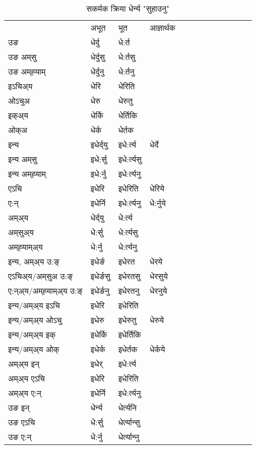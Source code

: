 \begin{table}[H]
\centering
\caption{\label{ert.vt} सकर्मक क्रिया  धेर्न्य  "सुहाउनु"  }
\begin{tabular}{l|l|l|l|l|l|l|l|l|l|l|l|l}  \toprule
&अभूत & भूत & आज्ञार्थक \\ 
उङ &धेर्दु &धे:र्त \\ 
उङ अम्‌सु&धेर्दुसु &धे:र्तसु \\ 
उङ अम्‌ह्‍याम्&धेर्दुनु &धे:र्तनु \\ 
इऽचिअ्य &धेरि &धेरिति   \\ 
ओऽचुअ        &धेरु &धेरुतु   \\ 
इक्अ्य&धेर्कि &धेर्तिकि   \\ 
ओक्अ &धेर्क &धेर्तक   \\ 
इन्य & इधेर्द्‌यु  & इधे:र्त्य &धेर्दे  \\ 
इन्य अम्‌सु& इधे:र्सु  & इधे:र्त्यसु   \\ 
इन्य अम्‌ह्‍याम्& इधे:र्नु  & इधे:र्त्यनु   \\ 
एऽचि & इधेरि & इधेरिति &धेरिये    \\ 
ए:न् & इधेर्नि  & इधे:र्त्यनु &धे:र्नुये  \\ 
अम्अ्य & धेर्द्‌यु  & धे:र्त्य  \\ 
अम्‌सुअ्य & धे:र्सु & धे:र्त्यसु  \\ 
अम्‌ह्‍याम्अ्य & धे:र्नु  & धे:र्त्यनु \\ 
\midrule
इन्य, अम्अ्य उ:ङ्‌ &इधेर्ङ &इधेरत &धेरये \\ 
एऽचिअ्य/अम्‌सुअ उ:ङ्‌ &इधेर्ङसु &इधेरतसु &धेरसुये \\ 
ए:न्अ्य/अम्‌ह्‍याम्अ्य उ:ङ्‌ &इधेर्ङनु &इधेरतनु &धेरनुये \\ 
इन्य/अम्अ्य इऽचि &इधेरि &इधेरिति    \\ 
इन्य/अम्अ्य ओऽचु &इधेरु &इधेरुतु  &धेरुये  \\ 
इन्य/अम्अ्य इक् &इधेर्कि &इधेर्तिकि   \\ 
इन्य/अम्अ्य ओक् &इधेर्क &इधेर्तक  &धेर्कये  \\ 
अम्अ्य इन् & इधेर् & इधे:र्त्य   \\ 
अम्अ्य एऽचि & इधेरि & इधेरिति    \\ 
अम्अ्य ए:न् & इधेर्नि  & इधे:र्त्यनु  \\ 
\midrule
उङ इन् & धेर्न्य  & धेर्त्यनि  \\ 
उङ एऽचि & धे:र्सु  & धेर्त्यान्सु   \\ 
उङ ए:न्& धे:र्नु  & धेर्त्यान्‍नु   \\ 
\bottomrule
\end{tabular}
\end{table}


